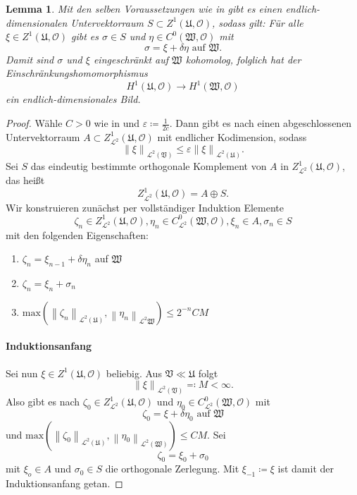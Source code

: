 \documentclass[11pt,a4paper,toc=bibliography]{scrartcl}
\theoremstyle{thm}
\newtheorem{lemma}{Lemma}[section]
\theoremstyle{def}
\theoremstyle{remark}
\newcommand{\norm}[1]{\left\lVert#1\right\rVert}
\begin{document}
\begin{lemma}
Mit den selben Voraussetzungen wie in  gibt es einen endlich-dimensionalen Untervektorraum $S\subset Z^1(\mathfrak{U},\mathcal{O})$, sodass gilt:
Für alle $\xi\in Z^1(\mathfrak{U},\mathcal{O})$ gibt es $\sigma\in S$ und $\eta\in C^0(\mathfrak{W},\mathcal{O})$ mit
\[
\sigma = \xi +\delta\eta\text{ auf } \mathfrak{W}.
\]
Damit sind $\sigma$ und $\xi$ eingeschränkt auf $\mathfrak{W}$ kohomolog, folglich hat der Einschränkungshomomorphismus 
\[
H^1(\mathfrak{U},\mathcal{O})\rightarrow H^1(\mathfrak{W},\mathcal{O})
\]
ein endlich-dimensionales Bild.
\end{lemma}
\begin{proof}

Wähle $C>0$ wie in  und $\varepsilon\coloneqq \frac{1}{2c}$. Dann gibt es nach  einen abgeschlossenen Untervektorraum $A\subset Z^1_{\mathcal{L}^2}(\mathfrak{U},\mathcal{O})$ mit endlicher Kodimension, sodass
\[
\norm{\xi}_{\mathcal{L}^2(\mathfrak{V})}\leq \varepsilon\norm{\xi}_{\mathcal{L}^2(\mathfrak{U})}.
\]
Sei $S$ das eindeutig bestimmte orthogonale Komplement von $A$ in $Z^1_{\mathcal{L}^2}(\mathfrak{U},\mathcal{O})$, das heißt
\[
Z^1_{\mathcal{L}^2}(\mathfrak{U},\mathcal{O}) = A\oplus S.
\]
Wir konstruieren zunächst per vollständiger Induktion Elemente 
\[
\zeta_n\in Z^1_{\mathcal{L}^2}(\mathfrak{U},\mathcal{O}),\eta_n\in C^0_{\mathcal{L}^2}(\mathfrak{W},\mathcal{O}),\xi_n\in A, \sigma_n\in S
\]
mit den folgenden Eigenschaften:
\begin{enumerate}
\item $\zeta_n = \xi_{n-1}+\delta \eta_n$ auf $\mathfrak{W}$
\item $\zeta_n = \xi_n+\sigma_n$
\item $\mathrm{max}\left(\norm{\zeta_n}_{\mathcal{L}^2(\mathfrak{U})},\norm{\eta_n}_{\mathcal{L}^2{\mathfrak{W}}}\right)\leq 2^{-n}CM$
\end{enumerate}
\paragraph*{Induktionsanfang}
Sei nun $\xi\in Z^1(\mathfrak{U},\mathcal{O})$ beliebig. Aus $\mathfrak{V}\ll \mathfrak{U}$ folgt
\[
\norm{\xi}_{\mathcal{L}^2(\mathfrak{V})}\eqqcolon M <\infty.
\]
Also gibt es nach  $\zeta_0\in Z^1_{\mathcal{L}^2}(\mathfrak{U},\mathcal{O})$ und $\eta_0\in C^0_{\mathcal{L}^2}(\mathfrak{W},\mathcal{O})$ mit
\[
\zeta_0 = \xi + \delta\eta_0 \text{ auf } \mathfrak{W}
\]
und $\mathrm{max}(\norm{\zeta_0}_{\mathcal{L}^2(\mathfrak{U})},\norm{\eta_0}_{\mathcal{L}^2(\mathfrak{W})})\leq CM.$
Sei
\[
\zeta_0 = \xi_0+\sigma_0
\]
mit $\xi_o\in A$ und $\sigma_0\in S$ die orthogonale Zerlegung.
Mit $\xi_{-1}\coloneqq \xi$ ist damit der Induktionsanfang getan.

\end{proof}
\end{document}
